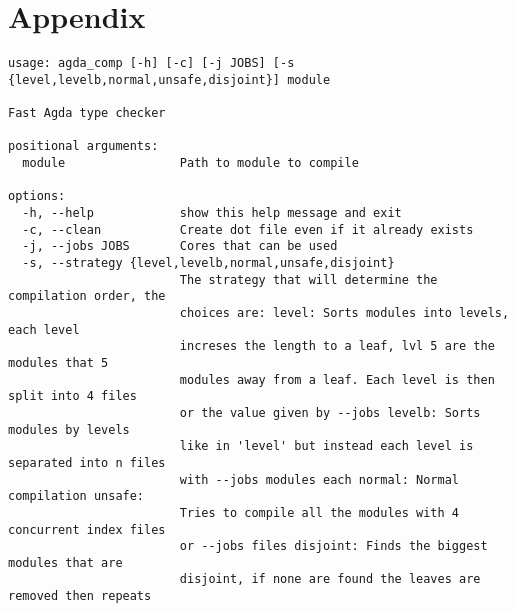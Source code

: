 \chapter{Appendix}


\begin{lstlisting}[caption={Agda Comp Help Message},label={code:agda comp help}]
usage: agda_comp [-h] [-c] [-j JOBS] [-s {level,levelb,normal,unsafe,disjoint}] module

Fast Agda type checker

positional arguments:
  module                Path to module to compile

options:
  -h, --help            show this help message and exit
  -c, --clean           Create dot file even if it already exists
  -j, --jobs JOBS       Cores that can be used
  -s, --strategy {level,levelb,normal,unsafe,disjoint}
                        The strategy that will determine the compilation order, the
                        choices are: level: Sorts modules into levels, each level
                        increses the length to a leaf, lvl 5 are the modules that 5
                        modules away from a leaf. Each level is then split into 4 files
                        or the value given by --jobs levelb: Sorts modules by levels
                        like in 'level' but instead each level is separated into n files
                        with --jobs modules each normal: Normal compilation unsafe:
                        Tries to compile all the modules with 4 concurrent index files
                        or --jobs files disjoint: Finds the biggest modules that are
                        disjoint, if none are found the leaves are removed then repeats
\end{lstlisting}

